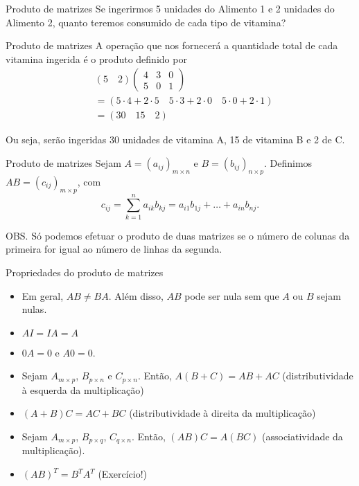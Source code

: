 \documentclass{beamer}
\begin{document}
\begin{darkframes}
\begin{frame}{Produto de matrizes}
Se ingerirmos 5 unidades do Alimento 1 e 2 unidades do Alimento 2, quanto teremos consumido de cada tipo de vitamina?
\end{frame}

\begin{frame}{Produto de matrizes}
A operação que nos fornecerá a quantidade total de cada vitamina ingerida é o produto definido por
\begin{align*}
     & \left( 5 \quad 2 \right)
         \begin{pmatrix}
             4 & 3 & 0\\
             5 & 0 & 1
         \end{pmatrix}\\
     &= \left( 5\cdot 4 + 2\cdot 5 \quad 5\cdot 3 + 2\cdot 0 \quad 5\cdot 0 + 2\cdot 1 \right)\\
     &= \left( 30 \quad 15 \quad 2\right)
 \end{align*}

Ou seja, serão ingeridas 30 unidades de vitamina A, 15 de vitamina B e 2 de C.
\end{frame}

\begin{frame}{Produto de matrizes}
Sejam $A = (a_{ij})_{m\times n}$ e $B = (b_{ij})_{n\times p}$. Definimos $AB = (c_{ij})_{m\times p}$, com
 \begin{equation*}
     c_{ij} = \sum_{k = 1}^n a_{ik}b_{kj} = a_{i1}b_{1j} + \ldots + a_{in}b_{nj}.
 \end{equation*}

OBS. Só podemos efetuar o produto de duas matrizes se o número de colunas da primeira for igual ao número de linhas da segunda.
\end{frame}

\begin{frame}{Propriedades do produto de matrizes}
 \begin{itemize}
     \item<2->[(i)] Em geral, $AB\ne BA$. Além disso, $AB$ pode ser nula sem que $A$ ou $B$ sejam nulas.
     \item<3->[(ii)] $AI = IA = A$
     \item<4->[(iii)] $0A = 0$ e $A0 = 0$.
     \item<5->[(iv)] Sejam $A_{m\times p}$, $B_{p\times n}$ e $C_{p\times n}$. Então, $A(B+C) = AB+AC$ (distributividade à esquerda da multiplicação)
     \item<6->[(v)] $(A+B)C = AC+BC$ (distributividade à direita da multiplicação)
     \item<7->[(vi)] Sejam $A_{m\times p}$, $B_{p\times q}$, $C_{q\times n}$. Então, $(AB)C = A(BC)$ (associatividade da multiplicação).
     \item<8->[(vii)] $(AB)^T = B^T A^T$ (Exercício!)
 \end{itemize}
 \end{frame}


\end{darkframes}
\end{document}
